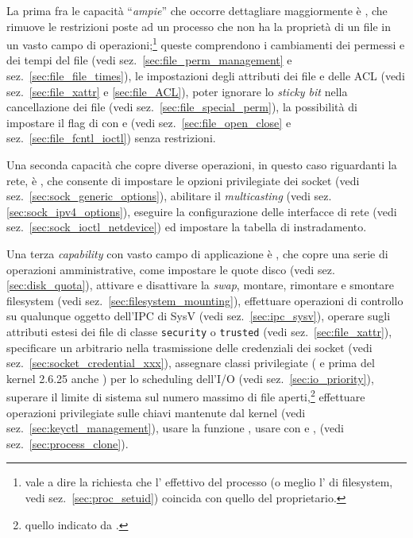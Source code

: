 
La prima fra le capacità ``\textsl{ampie}'' che occorre dettagliare
maggiormente è , che rimuove le restrizioni poste ad un
processo che non ha la proprietà di un file in un vasto campo di
operazioni;\footnote{vale a dire la richiesta che l' effettivo del
  processo (o meglio l' di filesystem, vedi
  sez.~\ref{sec:proc_setuid}) coincida con quello del proprietario.}  queste
comprendono i cambiamenti dei permessi e dei tempi del file (vedi
sez.~\ref{sec:file_perm_management} e sez.~\ref{sec:file_file_times}), le
impostazioni degli attributi dei file e delle ACL (vedi
sez.~\ref{sec:file_xattr} e \ref{sec:file_ACL}), poter ignorare lo
\textit{sticky bit} nella cancellazione dei file (vedi
sez.~\ref{sec:file_special_perm}), la possibilità di impostare il flag di
 con  e  (vedi
sez.~\ref{sec:file_open_close} e sez.~\ref{sec:file_fcntl_ioctl}) senza
restrizioni.


Una seconda capacità che copre diverse operazioni, in questo caso riguardanti
la rete, è , che consente di impostare le opzioni
privilegiate dei socket (vedi sez.~\ref{sec:sock_generic_options}), abilitare
il \textit{multicasting} (vedi sez.\ref{sec:sock_ipv4_options}), eseguire la
configurazione delle interfacce di rete (vedi
sez.~\ref{sec:sock_ioctl_netdevice}) ed impostare la tabella di instradamento.


Una terza \textit{capability} con vasto campo di applicazione è
, che copre una serie di operazioni amministrative,
come impostare le quote disco (vedi sez.\ref{sec:disk_quota}), attivare e
disattivare la \textit{swap}, montare, rimontare e smontare filesystem (vedi
sez.~\ref{sec:filesystem_mounting}), effettuare operazioni di controllo su
qualunque oggetto dell'IPC di SysV (vedi sez.~\ref{sec:ipc_sysv}), operare
sugli attributi estesi dei file di classe \texttt{security} o \texttt{trusted}
(vedi sez.~\ref{sec:file_xattr}), specificare un  arbitrario nella
trasmissione delle credenziali dei socket (vedi
sez.~\ref{sec:socket_credential_xxx}), assegnare classi privilegiate
( e prima del kernel 2.6.25 anche
) per lo scheduling dell'I/O (vedi
sez.~\ref{sec:io_priority}), superare il limite di sistema sul numero massimo
di file aperti,\footnote{quello indicato da .}
effettuare operazioni privilegiate sulle chiavi mantenute dal kernel (vedi
sez.~\ref{sec:keyctl_management}), usare la funzione ,
usare  con  e , (vedi
sez.~\ref{sec:process_clone}).

